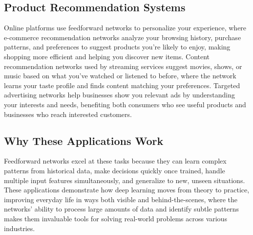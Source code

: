 \subsection{Product Recommendation Systems}

Online platforms use feedforward networks to personalize your experience, where e-commerce recommendation networks analyze your browsing history, purchase patterns, and preferences to suggest products you're likely to enjoy, making shopping more efficient and helping you discover new items. Content recommendation networks used by streaming services suggest movies, shows, or music based on what you've watched or listened to before, where the network learns your taste profile and finds content matching your preferences. Targeted advertising networks help businesses show you relevant ads by understanding your interests and needs, benefiting both consumers who see useful products and businesses who reach interested customers.

\subsection{Why These Applications Work}

Feedforward networks excel at these tasks because they can learn complex patterns from historical data, make decisions quickly once trained, handle multiple input features simultaneously, and generalize to new, unseen situations. These applications demonstrate how deep learning moves from theory to practice, improving everyday life in ways both visible and behind-the-scenes, where the networks' ability to process large amounts of data and identify subtle patterns makes them invaluable tools for solving real-world problems across various industries.

